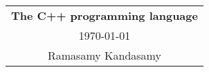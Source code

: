 



\raggedright
\footnotesize
\begin{multicols*}{3}
\setlength{\premulticols}{1pt}
\setlength{\postmulticols}{1pt}
\setlength{\multicolsep}{1pt}
\setlength{\columnsep}{2pt}



\begin{center}
\begin{tabular}{c}
\Large{\textbf{The C++ programming language}}\\
\today\\
Ramasamy Kandasamy\\
\end{tabular}
\end{center}




\vfill\null
\columnbreak



\vfill\null
\columnbreak

% 

















\vfill\null
\pagebreak















\end{multicols*}



